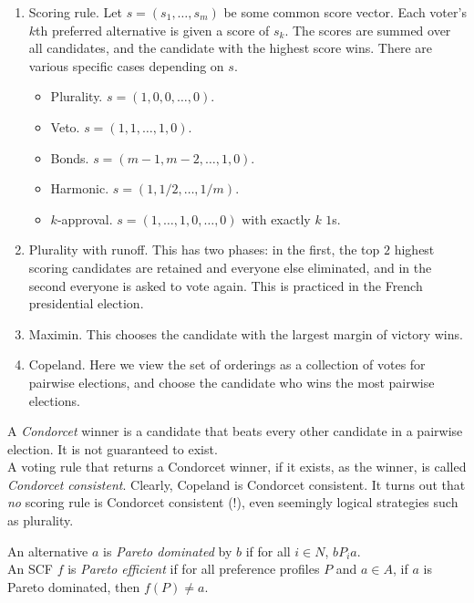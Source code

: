 	\begin{fex}[Voting]
		\phantom{pain}
		\begin{enumerate}
		\item Scoring rule. Let $s = (s_1,\ldots,s_m)$ be some common score vector. Each voter's $k$th preferred alternative is given a score of $s_k$. The scores are summed over all candidates, and the candidate with the highest score wins. There are various specific cases depending on $s$.
		\begin{itemize}
			\item Plurality. $s = (1,0,0,\ldots,0)$.
			\item Veto. $s = (1,1,\ldots,1,0)$.
			\item Bonds. $s = (m-1,m-2,\ldots,1,0)$.
			\item Harmonic. $s = (1,1/2,\ldots,1/m)$.
			\item $k$-approval. $s = (1,\ldots,1,0,\ldots,0)$ with exactly $k$ $1$s.
		\end{itemize}

		\item Plurality with runoff. This has two phases: in the first, the top $2$ highest scoring candidates are retained and everyone else eliminated, and in the second everyone is asked to vote again. This is practiced in the French presidential election.
		
		\item Maximin. This chooses the candidate with the largest margin of victory wins.

		\item Copeland. Here we view the set of orderings as a collection of votes for pairwise elections, and choose the candidate who wins the most pairwise elections.
		\end{enumerate}
		A \emph{Condorcet} winner is a candidate that beats every other candidate in a pairwise election. It is not guaranteed to exist.\\
		A voting rule that returns a Condorcet winner, if it exists, as the winner, is called \emph{Condorcet consistent}. Clearly, Copeland is Condorcet consistent. It turns out that \emph{no} scoring rule is Condorcet consistent (!), even seemingly logical strategies such as plurality.
	\end{fex}

	\begin{fdef}
		An alternative $a$ is \emph{Pareto dominated} by $b$ if for all $i \in N$, $b P_i a$.\\
		An SCF $f$ is \emph{Pareto efficient} if for all preference profiles $P$ and $a \in A$, if $a$ is Pareto dominated, then $f(P) \ne a$.
	\end{fdef}


